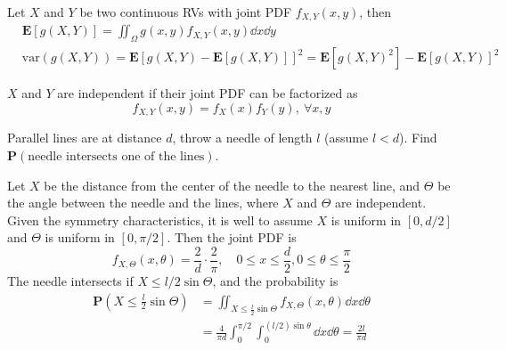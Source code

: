 \begin{definition}
    Let $X$ and $Y$ be two continuous RVs with joint PDF $f_{X, Y}(x, y)$, then
    \begin{equation}
    \begin{aligned}
        &\mathbf{E}[g(X, Y)] = \iint_{\Omega} g(x, y) f_{X, Y}(x, y) \dd{x} \dd{y} \\ 
        &\text{var}(g(X, Y)) = \mathbf{E}[g(X, Y) - \mathbf{E}[g(X, Y)]]^2 = \mathbf{E}[g(X, Y)^2] - \mathbf{E}[g(X, Y)]^2
    \end{aligned}
    \end{equation}
\end{definition}

\begin{definition}[Independence]
    $X$ and $Y$ are independent if their joint PDF can be factorized as
    \begin{equation}
        f_{X, Y}(x, y) = f_{X}(x) f_{Y}(y), ~\forall x, y
    \end{equation}
\end{definition}

\begin{example}
    Parallel lines are at distance $d$, throw a needle of length $l$ (assume $l < d$). Find $\mathbf{P}(\text{needle intersects one of the lines})$.  
    \begin{solution}
        Let $X$ be the distance from the center of the needle to the nearest line, and $\Theta$ be the angle between the needle and the lines, where $X$ and $\Theta$ are independent. Given the symmetry characteristics, it is well to assume $X$ is uniform in $[0, d/2]$ and $\Theta$ is uniform in $[0, \pi/2]$. Then the joint PDF is
    \begin{equation}
        f_{X, \Theta}(x, \theta) = \frac{2}{d} \cdot \frac{2}{\pi}, \quad 0 \leq x \leq \frac{d}{2}, 0 \leq \theta \leq \frac{\pi}{2}
    \end{equation}
    The needle intersects if $X \leq l/2 \sin\Theta$, and the probability is
    \begin{equation}
    \begin{aligned}
        \mathbf{P}(X \leq \frac{l}{2}\sin\Theta) &= \iint_{X\leq\frac{l}{2}\sin\Theta} f_{X, \Theta}(x, \theta) \dd{x} \dd{\theta} \\ 
        &= \frac{4}{\pi d} \int_{0}^{\pi/2} \int_{0}^{(l/2)\sin\theta} \dd{x} \dd{\theta} = \frac{2l}{\pi d}
    \end{aligned}
    \end{equation}
    \end{solution}
\end{example}


